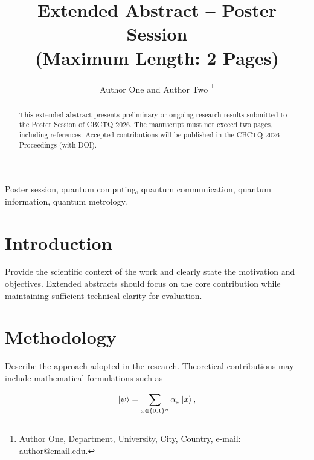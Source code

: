 \documentclass{cbctq}
\begin{document}
\title{Extended Abstract -- Poster Session\\
\large (Maximum Length: 2 Pages)
}

\author{
Author One and Author Two%
\thanks{
Author One, Department, University, City, Country, e-mail: author@email.edu.
}
}

\maketitle




\begin{abstract}
This extended abstract presents preliminary or ongoing research results submitted to the Poster Session of CBCTQ 2026. The manuscript must not exceed two pages, including references. Accepted contributions will be published in the CBCTQ 2026 Proceedings (with DOI).
\end{abstract}

\begin{keywords}
Poster session, quantum computing, quantum communication, quantum information, quantum metrology.
\end{keywords}

\section{Introduction}

Provide the scientific context of the work and clearly state the motivation and objectives. Extended abstracts should focus on the core contribution while maintaining sufficient technical clarity for evaluation.

\section{Methodology}

Describe the approach adopted in the research. Theoretical contributions may include mathematical formulations such as

\begin{equation}
\ket{\psi} = \sum_{x \in \{0,1\}^n} \alpha_x \ket{x},
\end{equation}
\end{document}
